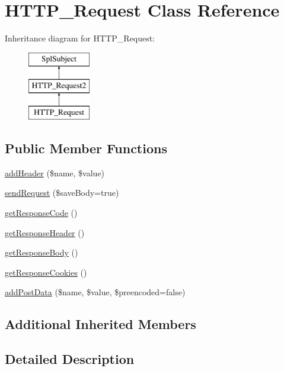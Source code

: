 \hypertarget{classHTTP__Request}{}\section{H\+T\+T\+P\+\_\+\+Request Class Reference}
\label{classHTTP__Request}
Inheritance diagram for H\+T\+T\+P\+\_\+\+Request\+:\begin{figure}[H]
\begin{center}
\leavevmode
\includegraphics[height=3.000000cm]{classHTTP__Request}
\end{center}
\end{figure}
\subsection*{Public Member Functions}
\begin{DoxyCompactItemize}
\item 
\hyperlink{classHTTP__Request_ad7ce4b414109089320151442d1aa23d3}{add\+Header} (\$name, \$value)
\item 
\hyperlink{classHTTP__Request_af3e8b1423f6a2858652063c4a6f697a0}{send\+Request} (\$save\+Body=true)
\item 
\hyperlink{classHTTP__Request_adca0e2580505791e5ad42f7737568ade}{get\+Response\+Code} ()
\item 
\hyperlink{classHTTP__Request_a821d6c29dea6073a0d7f5e414d1237a6}{get\+Response\+Header} ()
\item 
\hyperlink{classHTTP__Request_a8cf9237fc5a74cc2d797b64b7823db08}{get\+Response\+Body} ()
\item 
\hyperlink{classHTTP__Request_a5fc2cc22a0652620d6866994397f5418}{get\+Response\+Cookies} ()
\item 
\hyperlink{classHTTP__Request_a3b856946e8c0ccc2c84dac7c7e93bd9d}{add\+Post\+Data} (\$name, \$value, \$preencoded=false)
\end{DoxyCompactItemize}
\subsection*{Additional Inherited Members}


\subsection{Detailed Description}


